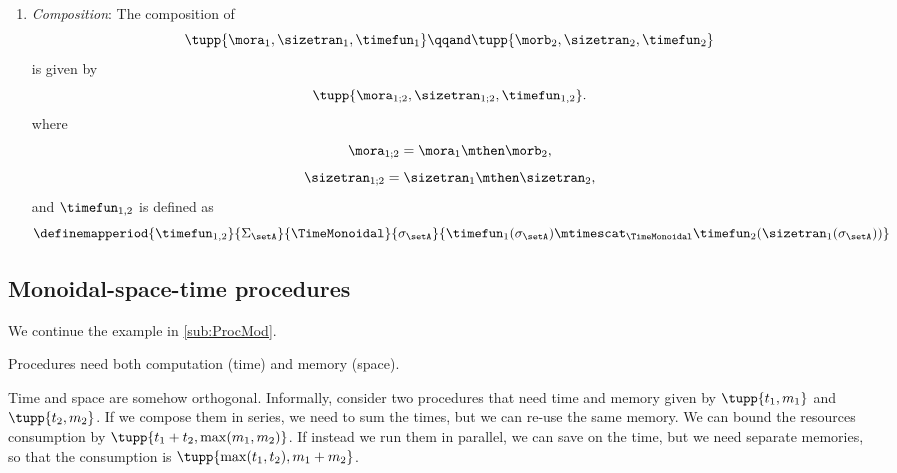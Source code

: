 \begin{definition}
\begin{enumerate}
        \item \emph{Composition}: The composition of
        \begin{equation}
            \tupp{\mora_1, \sizetran_1,  \timefun_1  }
            \qqand
            \tupp{\morb_2, \sizetran_2,  \timefun_2  }
        \end{equation}
        is given by
        \begin{equation}
            \tupp{
                \mora_{1;2},
                \sizetran_{1;2},
                \timefun_{1,2}
            }.
        \end{equation}
        where
        \begin{equation}
            \mora_{1;2} = \mora_1 \mthen \morb_2,
        \end{equation}
        \begin{equation}
            \sizetran_{1;2} = \sizetran_1 \mthen \sizetran_2,
        \end{equation}
        and $\timefun_{1,2}$ is defined as
        \begin{equation}\label{eq:timefun-composition}
            \definemapperiod{
                \timefun_{1,2}
            }{
                \Sigma_{\setA}
            }{
                \TimeMonoidal
            }{
                \sigma_{\setA}
            }{
                \timefun_1(\sigma_{\setA}) \mtimescat_{\TimeMonoidal} \timefun_2(\sizetran_1(\sigma_{\setA}))
            }
        \end{equation}
    \end{enumerate}
\end{definition}




\subsection{Monoidal-space-time procedures}
\label{sub:monoidal-space-time}
We continue the example in \cref{sub:ProcMod}.

Procedures need both computation (time) and memory (space).

Time and space are somehow orthogonal.
%
Informally, consider two procedures that need time and memory given by $\tupp{t_1,m_1}$ and $\tupp{t_2, m_2}$. If we compose them in series, we need to sum the times, but we can re-use the same memory. We can bound the resources consumption  by $\tupp{t_1+t_2,\max(m_1, m_2)}$.
If instead we run them in parallel, we can save on the time, but we need separate memories, so that the consumption is $\tupp{\max(t_1,t_2), m_1 + m_2}$.

